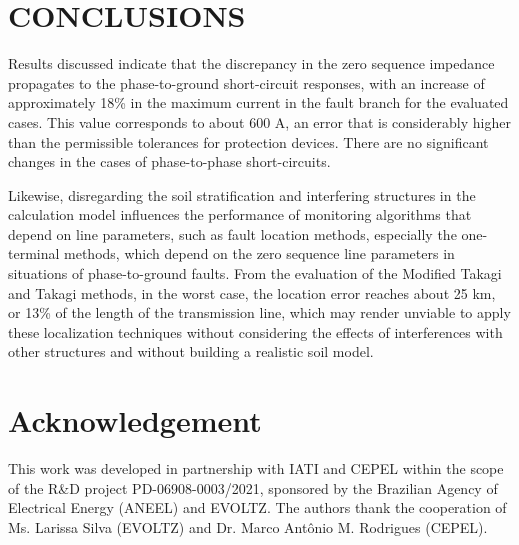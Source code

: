 \documentclass[conference]{IEEEtran}
\begin{document}
	\section{CONCLUSIONS}
	
	Results discussed indicate that the discrepancy in the zero sequence impedance propagates to the phase-to-ground short-circuit responses, with an increase of approximately 18\% in the maximum current in the fault branch for the evaluated cases. This value corresponds to about 600 A, an error that is considerably higher than the permissible tolerances for protection devices. There are no significant changes in the cases of phase-to-phase short-circuits.
	
	Likewise, disregarding the soil stratification and interfering structures in the calculation model influences the performance of monitoring algorithms that depend on line parameters, such as fault location methods, especially the one-terminal methods, which depend on the zero sequence line parameters in situations of phase-to-ground faults. From the evaluation of the Modified Takagi and Takagi methods, in the worst case, the location error reaches about 25 km, or 13\% of the length of the transmission line, which may render unviable to apply these localization techniques without considering the effects of interferences with other structures and without building a realistic soil model.
	
	\section*{Acknowledgement}
	This work was developed  in partnership with IATI and CEPEL within the scope of the R\&D project PD-06908-0003/2021, sponsored by the Brazilian Agency of Electrical Energy (ANEEL) and EVOLTZ. The authors thank the cooperation of Ms. Larissa Silva (EVOLTZ) and Dr. Marco Antônio M. Rodrigues (CEPEL).
	
	
	\nocite{*}
	
	
	
\end{document}
